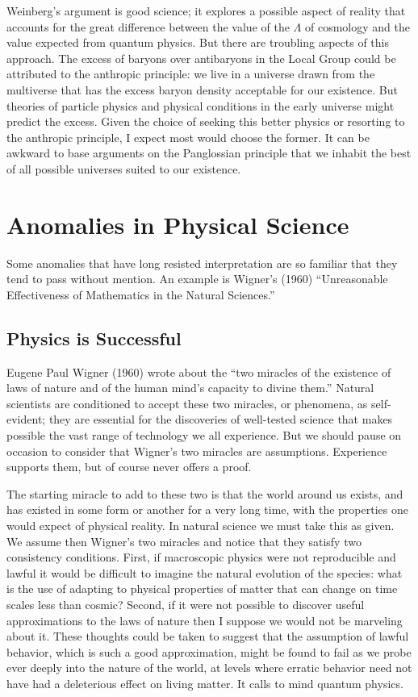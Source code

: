 \documentclass[fleqn,usenatbib]{mnras}
\begin{document}
Weinberg's argument is good science; it explores a possible aspect of reality that accounts for the great difference between the value of the $\Lambda$ of cosmology and the value expected from quantum physics. But there are troubling aspects of this approach. The excess of baryons over antibaryons in the Local Group could be attributed to the anthropic principle: we live in a universe drawn from the multiverse that has the excess baryon density acceptable for our existence. But theories of particle physics and physical conditions in the early universe might predict the excess. Given the choice of seeking this better physics or resorting to the anthropic principle, I expect most would choose the former. It can be awkward to base arguments on the Panglossian principle that we inhabit the best of all possible universes suited to our existence.

\section{Anomalies in Physical Science}\label{sec:anomalies}

Some anomalies that have long resisted interpretation are so familiar that they tend to pass without mention. An example is Wigner's (1960) ``Unreasonable Effectiveness of Mathematics in the Natural Sciences.''

\subsection{Physics is Successful} \label{PhysicsisSuccessful}

Eugene Paul Wigner (1960) wrote about the ``two miracles of the existence of laws of nature and of the human mind's capacity to divine them.'' Natural scientists are conditioned to accept these two miracles, or phenomena, as self-evident; they are essential for the discoveries of well-tested science that makes possible the vast range of technology we all experience.  But we should pause on occasion to consider that Wigner's  two miracles are assumptions. Experience supports them, but of course never offers a proof.

The starting miracle to add to these two is that the world around us exists, and has existed in some form or another for a very long time, with the properties one would expect of physical reality. In natural science we must take this as given. We assume then Wigner's two miracles and notice that they satisfy two consistency conditions. First, if macroscopic physics were not reproducible and lawful it would be difficult to imagine the natural evolution of the species: what is the use of adapting to physical properties of matter that can change on time scales less than cosmic? Second, if it were not possible to discover useful approximations to the laws of nature then I suppose we would not be marveling about it. These thoughts could be taken to suggest that the assumption of lawful behavior, which is such a good approximation, might be found to fail as we probe ever deeply into the nature of the world, at levels where erratic behavior need not have had a deleterious effect on living matter. It calls to mind quantum physics. 
\end{document}
